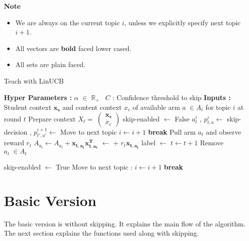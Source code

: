 \textbf{Note}
\begin{itemize}
    \item We are always on the current topic $i$, unless we explicitly specify next topic $i+1$.
    \item All vectors are \textbf{bold} faced lower cased.
    \item All sets are plain faced.
\end{itemize}

\begin{algorithm}
\caption{Teach with LinUCB}
\begin{algorithmic}[1]
 \State \textbf{Hyper Parameters :} $\alpha$ $\in$  $\mathbb{R_+}$
    \State \qquad \qquad \qquad \qquad \qquad \, $C$ : Confidence threshold to skip 
    \State \textbf{Inputs :} Student context $\mathbf{x_s}$ and content context $x_c$ of available arm $a \; \in A_t$ for topic $i$ at round $t$
    \State Prepare context $X_{t} = \;\begin{pmatrix} \mathbf{x_s} \\ x_c \end{pmatrix}$
    \State skip-enabled $\gets$ False
    \State $a^{i}_{t}$ , $p^{i}_{t,a} \gets$ \; 
    \State skip-decision , $p^{i+1}_{t',a'} \gets$ 
    \State Move to next topic $i \gets i+1$
    \State \textbf{break}
    \Else 
    \State Pull arm $a_t$ and observe reward $r_{t}$
    \State $A_{a_t} \gets A_{a_t} + \mathbf{x_{t,a_t}x^{T}_{t,a_t}}$
    \State {} $\gets$  + $r_{t}\mathbf{x_{t,a_{t}}}$
    \State label $\gets$ 
    \State {}
    \State $t \gets t+1$
    \EndIf 
    \State Remove $a_t \; \in A_t$
    
    \State skip-enabled $\gets$ True
    \Else 
    \State Move to next topic : $i \gets i+1$
    \State \textbf{break}
    \EndIf 
    \EndWhile
\end{algorithmic}
\end{algorithm}

\section{Basic Version \label{chap4:basic}}

The basic version is without skipping. It explains the main flow of the algorithm. The next section explains the functions used along with skipping. \par


